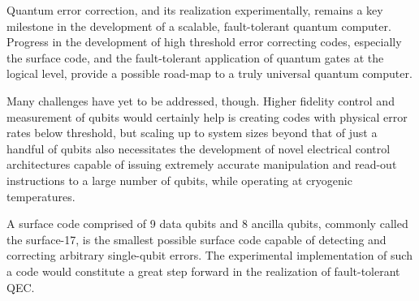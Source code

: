 Quantum error correction, and its realization experimentally, remains a key
milestone in the development of a scalable, fault-tolerant quantum computer.
Progress in the development of high threshold error correcting codes, especially
the surface code, and the fault-tolerant application of quantum gates at the
logical level, provide a possible road-map to a truly universal quantum
computer.

Many challenges have yet to be addressed, though. Higher fidelity control and
measurement of qubits would certainly help is creating codes with physical error
rates below threshold, but scaling up to system sizes beyond that of just a
handful of qubits also necessitates the development of novel electrical control
architectures capable of issuing extremely accurate manipulation and read-out
instructions to a large number of qubits, while operating at cryogenic
temperatures.

A surface code comprised of 9 data qubits and 8 ancilla qubits, commonly called
the surface-17, is the smallest possible surface code capable of detecting and
correcting arbitrary single-qubit errors. The experimental implementation of
such a code would constitute a great step forward in the realization of
fault-tolerant QEC.


